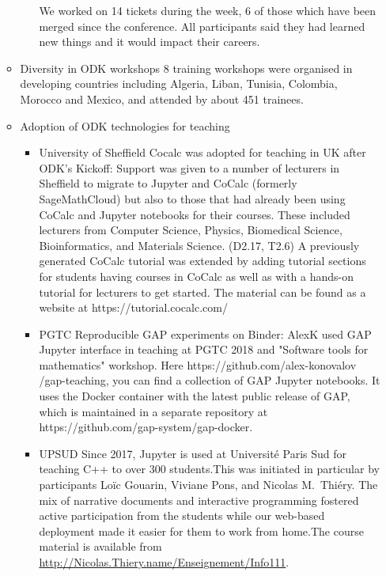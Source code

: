 \begin{enumerate}
\begin{itemize}
\begin{itemize}
We worked on 14 tickets during the week, 6 of those which have been merged since the conference. All participants said they had learned new 
things and it would impact their careers. %
\end{itemize}

\item Diversity in ODK workshops
8 training workshops were organised in developing countries including Algeria, Liban, Tunisia, Colombia, Morocco and Mexico, and attended by about 451 trainees.

\item Adoption of ODK technologies for teaching
\begin{itemize}
\item University of Sheffield
Cocalc was adopted for teaching in UK after ODK's Kickoff: Support was given to a number of lecturers in Sheffield to migrate to Jupyter and 
CoCalc (formerly SageMathCloud) but also to those that had already been using CoCalc and Jupyter notebooks for their courses. These included 
lecturers from Computer Science, Physics, Biomedical Science, Bioinformatics, and Materials Science. (D2.17, T2.6) A previously generated 
CoCalc tutorial was extended by adding tutorial sections for students having courses in CoCalc as well as with a hands-on tutorial for 
lecturers to get started. The material can be found as a website at https://tutorial.cocalc.com/ 

\item PGTC 
Reproducible GAP experiments on Binder: AlexK %
used GAP Jupyter interface in teaching at PGTC 2018 and "Software tools for mathematics" workshop. Here https://github.com/alex-konovalov
/gap-teaching, you can find a collection of GAP Jupyter notebooks. It uses the Docker container with the latest public release of GAP, which 
is maintained in a separate repository at https://github.com/gap-system/gap-docker.

\item UPSUD
Since 2017, Jupyter is used at Université Paris Sud for teaching C++ to over 300 students.This was initiated in particular by
     \ODK participants Loïc Gouarin, Viviane Pons, and Nicolas M.\ Thiéry. The mix of narrative documents and interactive programming 
     fostered active participation from the students while our web-based deployment made it easier for them to work from home.The course 
     material is available from \url{http://Nicolas.Thiery.name/Enseignement/Info111}.
     

\end{itemize}
\end{itemize}
\end{enumerate}
